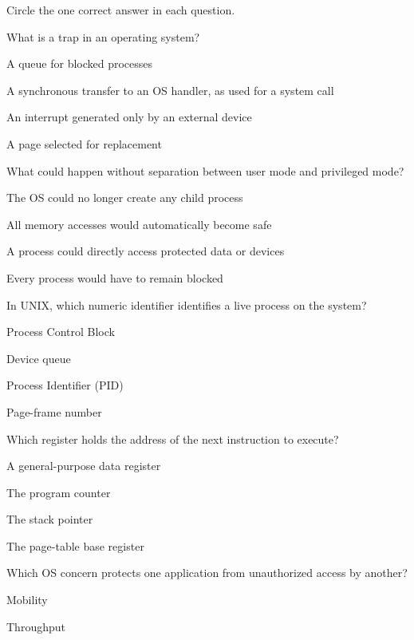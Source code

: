 \noindent Circle the one correct answer in each question.\par\smallskip
\begin{questions}\setlength{\itemsep}{0.12cm}\setcounter{question}{0}
\question What is a trap in an operating system?
\begin{verticalchoices}
\item A queue for blocked processes
\item A synchronous transfer to an OS handler, as used for a system call
\item An interrupt generated only by an external device
\item A page selected for replacement
\end{verticalchoices}
\question What could happen without separation between user mode and privileged mode?
\begin{verticalchoices}
\item The OS could no longer create any child process
\item All memory accesses would automatically become safe
\item A process could directly access protected data or devices
\item Every process would have to remain blocked
\end{verticalchoices}
\question In UNIX, which numeric identifier identifies a live process on the system?
\begin{verticalchoices}
\item Process Control Block
\item Device queue
\item Process Identifier (PID)
\item Page-frame number
\end{verticalchoices}
\question Which register holds the address of the next instruction to execute?
\begin{verticalchoices}
\item A general-purpose data register
\item The program counter
\item The stack pointer
\item The page-table base register
\end{verticalchoices}
\question Which OS concern protects one application from unauthorized access by another?
\begin{verticalchoices}
\item Mobility
\item Throughput

\end{verticalchoices}
\end{questions}
